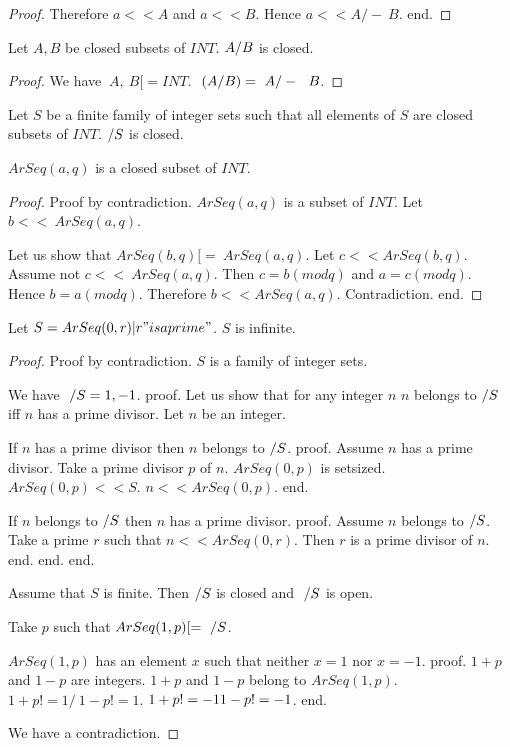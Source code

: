 \documentclass{document}
\begin{document}
\begin{forthel}
\begin{proof}
        Therefore $a << A$ and $a << B$. Hence $a << A /-\ B$.
      end.
    \end{proof}

    \begin{lemma}[UnionClosed]
      Let $A,B$ be closed subsets of $INT$. $A \-/ B$ is closed.
    \end{lemma}
    \begin{proof}
      We have $~A,~B [= INT$. $~(A \-/ B) = ~A /-\ ~B$.
    \end{proof}

    \begin{axiom}[UnionSClosed]
      Let $S$ be a finite family of integer sets such that all elements of $S$ are closed subsets of $INT$. $\-/ S$ is closed.
    \end{axiom}

    \begin{lemma}[ArSeqClosed]
      $ArSeq(a,q)$ is a closed subset of $INT$.
    \end{lemma}
    \begin{proof}
      Proof by contradiction. $ArSeq(a,q)$ is a subset of $INT$. Let $b << ~ArSeq (a,q)$.

      Let us show that $ArSeq(b,q) [= ~ArSeq(a,q)$. Let $c << ArSeq(b,q)$.
        Assume not $c << ~ArSeq(a,q)$. Then $c = b (mod q)$ and $a = c (mod q)$. Hence $b = a (mod q)$. Therefore $b << ArSeq(a,q)$. Contradiction.
      end.
    \end{proof}

    \begin{theorem}[Fuerstenberg]
      Let $S = {ArSeq(0,r) | r "is a prime"}$. $S$ is infinite.
    \end{theorem}
    \begin{proof}
      Proof by contradiction. $S$ is a family of integer sets.

      We have $~ \-/ S = {1, -1}$.
      proof.
        Let us show that for any integer $n$ $n$ belongs to $\-/ S$ iff $n$ has a prime divisor.
          Let $n$ be an integer.

          If $n$ has a prime divisor then $n$ belongs to $\-/ S$.
          proof.
            Assume $n$ has a prime divisor. Take a prime divisor $p$ of $n$. $ArSeq(0,p)$ is setsized. $ArSeq(0,p) << S$. $n << ArSeq(0,p)$.
          end.

          If $n$ belongs to $\-/ S$ then $n$ has a prime divisor.
          proof.
            Assume $n$ belongs to $\-/S$. Take a prime $r$ such that $n << ArSeq(0,r)$. Then $r$ is a prime divisor of $n$.
          end.
        end.
      end.

      Assume that $S$ is finite. Then $\-/ S$ is closed and $~ \-/ S$ is open.

      Take $p$ such that $ArSeq(1,p) [= ~ \-/ S$.

      $ArSeq(1,p)$ has an element $x$ such that neither $x = 1$ nor $x = -1$.
      proof.
        $1 + p$ and $1 - p$ are integers.
        $1 + p$ and $1 - p$ belong to $ArSeq(1,p)$. $1 + p !=  1 /\ 1 - p !=  1$. $1 + p != -1 \/ 1 - p != -1$.
      end.

      We have a contradiction.
    \end{proof}
  \end{forthel}
\end{document}
